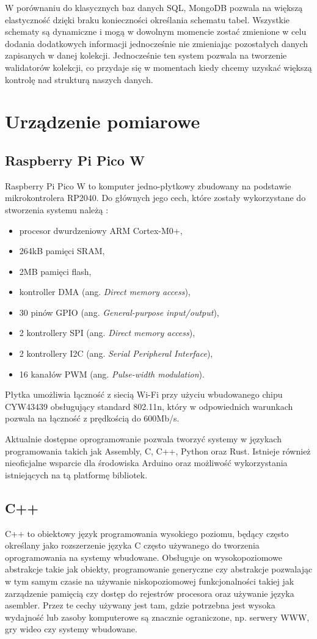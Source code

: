 W porównaniu do klasycznych baz danych SQL, MongoDB pozwala na większą elastyczność dzięki braku
konieczności określania schematu tabel. Wszystkie schematy są dynamiczne i mogą w dowolnym momencie 
zostać zmienione w celu dodania dodatkowych informacji jednocześnie nie zmieniając pozostałych
danych zapisanych w danej kolekcji. Jednocześnie ten system pozwala na tworzenie 
walidatorów kolekcji, co przydaje się w momentach kiedy chcemy uzyskać większą kontrolę
nad strukturą naszych danych.

\section{Urządzenie pomiarowe}

\subsection*{Raspberry Pi Pico W}
Raspberry Pi Pico W to komputer jedno-płytkowy zbudowany na podstawie mikrokontrolera RP2040. 
Do głównych jego cech, które zostały wykorzystane do stworzenia systemu należą \cite{rp2040:datasheet}:
\begin{itemize}
  \item procesor dwurdzeniowy ARM Cortex-M0+,
  \item 264kB pamięci SRAM,
  \item 2MB pamięci flash,
  \item kontroller DMA (ang. \textit{Direct memory access}),
  \item 30 pinów GPIO (ang. \textit{General-purpose input/output}),
  \item 2 kontrollery SPI (ang. \textit{Direct memory access}),
  \item 2 kontrollery I2C (ang. \textit{Serial Peripheral Interface}),
  \item 16 kanałów PWM (ang. \textit{Pulse-width modulation}).
\end{itemize}
Płytka umożliwia łączność z siecią Wi-Fi przy użyciu wbudowanego chipu CYW43439
obsługujący standard 802.11n, który w odpowiednich warunkach pozwala na łączność
z prędkością do 600Mb/s.

Aktualnie dostępne oprogramowanie pozwala tworzyć systemy w językach programowania takich jak
Assembly, C, C++, Python oraz Rust. Istnieje również nieoficjalne wsparcie dla środowiska
Arduino oraz możliwość wykorzystania istniejących na tą platformę bibliotek.

\subsection*{C++}
C++ to obiektowy język programowania wysokiego poziomu, będący często określany jako
rozszerzenie języka C często używanego do tworzenia oprogramowania na systemy wbudowane.
Obsługuje on wysokopoziomowe abstrakcje takie jak obiekty, programowanie generyczne czy
abstrakcje pozwalając w tym samym czasie na używanie niskopoziomowej funkcjonalności 
takiej jak zarządzenie pamięcią czy dostęp do rejestrów procesora oraz używanie języka asembler.
Przez te cechy używany jest tam, gdzie potrzebna jest wysoka wydajność lub zasoby komputerowe
są znacznie ograniczone, np. serwery WWW, gry wideo czy systemy wbudowane.

